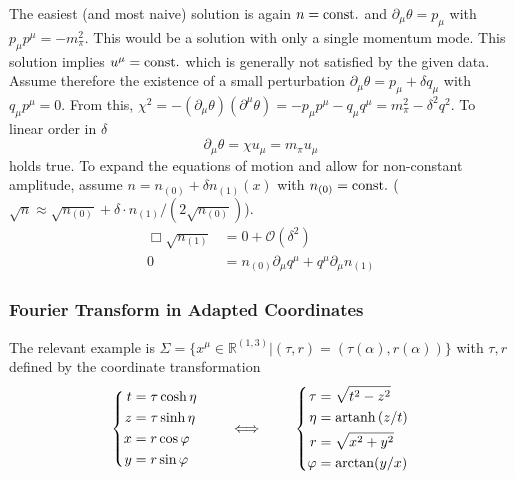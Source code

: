 The easiest (and most naive) solution is again $n={\text{const.}}$ and $\partial_\mu\theta=p_\mu$ with $p_\mu p^\mu=-m_\pi^2$. This would be a solution with only a single momentum mode. This solution implies $u^\mu={\text{const.}}$ which is generally not satisfied by the given data. Assume therefore the existence of a small perturbation $\partial_\mu\theta=p_\mu+\delta q_\mu$ with $q_\mu p^\mu = 0$. From this, $\chi^2=-(\partial_\mu\theta)(\partial^\mu\theta)=-p_\mu p^\mu-q_\mu q^\mu=m_\pi^2-\delta^2q^2$. To linear order in $\delta$
\begin{equation}
    \partial_\mu\theta=\chi u_\mu=m_\pi u_\mu
\end{equation}
holds true. To expand the equations of motion and allow for non-constant amplitude, assume $n=n_{(0)}+\delta n_{(1)}(x)$ with $n_{(0)}={\text{const.}}$ ($\sqrt{n}\approx\sqrt{n_{(0)}}+\delta\cdot n_{(1)}/(2\sqrt{n_{(0)}})$). 
\begin{subequations}
    \begin{align}
        \Box\sqrt{n_{(1)}}&=0+\mathcal{O}(\delta^2)\\
        0&=n_{(0)}\partial_\mu q^\mu+q^\mu\partial_\mu n_{(1)}
    \end{align}
\end{subequations}

\subsubsection{Fourier Transform in Adapted Coordinates}

The relevant example is $\Sigma=\{x^\mu\in\mathbb{R}^{(1,3)}\vert (\tau,r)=(\tau(\alpha),r(\alpha))\}$ with $\tau,r$ defined by the coordinate transformation
\begin{equation}
    \left\{\begin{split}
        t&=\tau\cosh\eta\\
        z&=\tau\sinh\eta\\
        x&=r\cos\varphi\\
        y&=r\sin\varphi
    \end{split}\right.
    \qquad\iff\qquad
    \left\{\begin{split}
        \tau&=\sqrt{t^2-z^2}\\
        \eta&={\text{artanh}\,}(z/t)\\
        r&=\sqrt{x^2+y^2}\\
        \varphi&=\arctan(y/x)
    \end{split}\right.
\end{equation}


